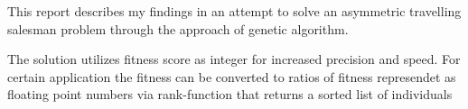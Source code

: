 This report describes my findings in an attempt to solve an
asymmetric travelling salesman problem through the approach
of genetic algorithm.

The solution utilizes fitness score as integer for increased precision
and speed. For certain application the fitness can be converted to
ratios of fitness represendet as floating point numbers via rank-function
that returns a sorted list of individuals
